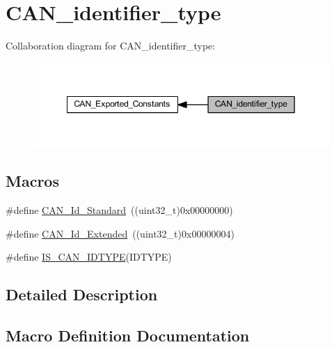 \hypertarget{group___c_a_n__identifier__type}{}\section{C\+A\+N\+\_\+identifier\+\_\+type}
\label{group___c_a_n__identifier__type}
Collaboration diagram for C\+A\+N\+\_\+identifier\+\_\+type\+:
\nopagebreak
\begin{figure}[H]
\begin{center}
\leavevmode
\includegraphics[width=349pt]{group___c_a_n__identifier__type}
\end{center}
\end{figure}
\subsection*{Macros}
\begin{DoxyCompactItemize}
\item 
\#define \hyperlink{group___c_a_n__identifier__type_ga151d9df8a6f361d0a3231593726b5a13}{C\+A\+N\+\_\+\+Id\+\_\+\+Standard}~((uint32\+\_\+t)0x00000000)
\item 
\#define \hyperlink{group___c_a_n__identifier__type_gaf6c5c0b43b968fed17fd90246912b1a7}{C\+A\+N\+\_\+\+Id\+\_\+\+Extended}~((uint32\+\_\+t)0x00000004)
\item 
\#define \hyperlink{group___c_a_n__identifier__type_gab845f7fbcf6ff8cf3d025210eb8900e4}{I\+S\+\_\+\+C\+A\+N\+\_\+\+I\+D\+T\+Y\+PE}(I\+D\+T\+Y\+PE)
\end{DoxyCompactItemize}


\subsection{Detailed Description}


\subsection{Macro Definition Documentation}
\mbox{\label{group___c_a_n__identifier__type_gaf6c5c0b43b968fed17fd90246912b1a7}} 
